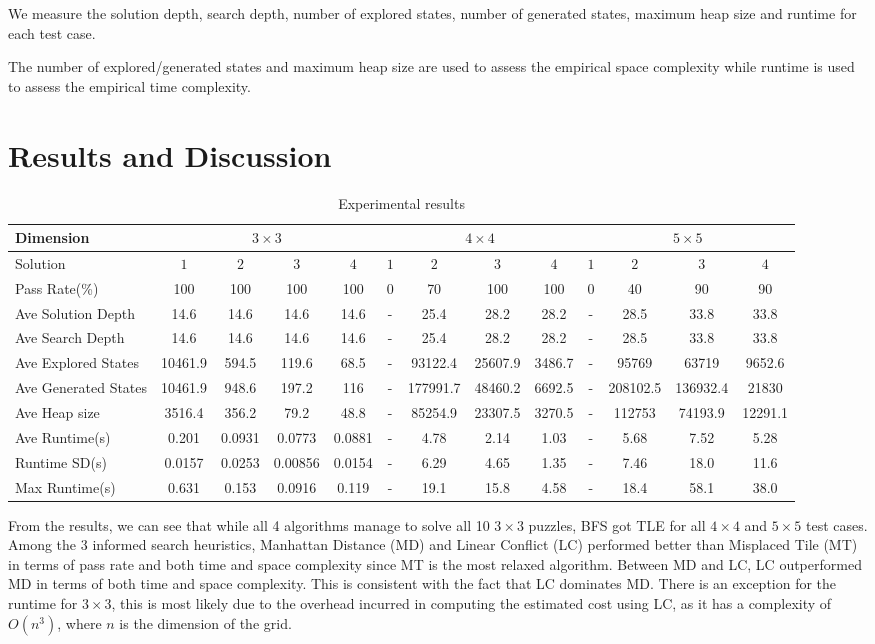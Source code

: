 \documentclass{llncs}
\begin{document}
We measure the solution depth, search depth, number of explored states, number of generated states, maximum heap size and runtime for each test case.

The number of explored/generated states and maximum heap size are used to assess the empirical space complexity while runtime is used to assess the empirical time complexity.

\section{Results and Discussion}
\begin{table}
	\centering
	\begin{tabular}{l|c|c|c|c|c|c|c|c|c|c|c|c} \hline
		Dimension & \multicolumn{4}{c|}{$3 \times 3$} & \multicolumn{4}{c|}{$4 \times 4$} & \multicolumn{4}{c}{$5 \times 5$} \\\hline
		Solution & $1$ & $2$ & $3$ & $4$ & $1$ & $2$ & $3$ & $4$ & $1$ & $2$ & $3$ & $4$ \\\hline
		Pass Rate(\%) & 100 & 100 & 100 & 100 & 0 & 70 & 100 & 100 & 0 & 40 & 90 & 90 \\\hline
		Ave Solution Depth & 14.6 & 14.6 & 14.6 & 14.6 & - & 25.4 & 28.2 & 28.2 & - & 28.5 & 33.8 & 33.8 \\\hline
		Ave Search Depth & 14.6 & 14.6 & 14.6 & 14.6 & - & 25.4 & 28.2 & 28.2 & - & 28.5 & 33.8 & 33.8 \\\hline
		Ave Explored States & 10461.9 & 594.5 & 119.6 & 68.5 & - & 93122.4 & 25607.9 & 3486.7 & - & 95769 & 63719 & 9652.6 \\\hline
		Ave Generated States & 10461.9 & 948.6 & 197.2 & 116 & - & 177991.7 & 48460.2 & 6692.5 & - & 208102.5 & 136932.4 & 21830 \\\hline
		Ave Heap size & 3516.4 & 356.2 & 79.2 & 48.8 & - & 85254.9 & 23307.5 & 3270.5 & - & 112753 & 74193.9 & 12291.1 \\\hline
		Ave Runtime(s) & 0.201 & 0.0931 & 0.0773 & 0.0881 & - & 4.78 & 2.14 & 1.03 & - & 5.68 & 7.52 & 5.28 \\\hline
		Runtime SD(s) & 0.0157 & 0.0253 & 0.00856 & 0.0154 & - & 6.29 & 4.65 & 1.35 & - & 7.46 & 18.0 & 11.6 \\\hline
		Max Runtime(s) & 0.631 & 0.153 & 0.0916 & 0.119 & - & 19.1 & 15.8 & 4.58 & - & 18.4 & 58.1 & 38.0 \\\hline
	\end{tabular}
	\caption{Experimental results}
	\label{tab:one}
\end{table}
From the results, we can see that while all 4 algorithms manage to solve all 10 $3 \times 3$ puzzles, BFS got TLE for all $4 \times 4$ and $5 \times 5$ test cases. Among the 3 informed search heuristics, Manhattan Distance (MD) and Linear Conflict (LC) performed better than Misplaced Tile (MT) in terms of pass rate and both time and space complexity since MT is the most relaxed algorithm. Between MD and LC, LC outperformed MD in terms of both time and space complexity. This is consistent with the fact that LC dominates MD. There is an exception for the runtime for $3 \times 3$, this is most likely due to the overhead incurred in computing the estimated cost using LC, as it has a complexity of $O(n^3)$, where $n$ is the dimension of the grid.
\end{document}

